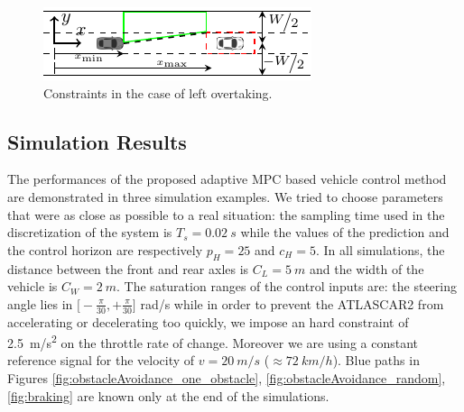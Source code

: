\documentclass[conference,11pt]{IEEEtran}
\begin{document}
\begin{figure}[H]
	\centering
	\includegraphics[width=0.9\columnwidth]{./figure/constraint/constraint.pdf}
%	
	\caption{Constraints in the case of left overtaking.}
	\label{fig:constraint}
\end{figure}
\subsection{Simulation Results}
The performances of the proposed adaptive MPC based vehicle control method are demonstrated in three
simulation examples. We tried to choose parameters that were as close as possible to a real situation: the sampling time used in the discretization of the system is $T_s=\SI{0.02}{s}$ while the values of the prediction and the control horizon are respectively $p_H=25$ and $c_H=5$. In all simulations, the distance between the front and rear axles is $C_L=\SI{5}{m}$ and the width of the vehicle is $C_W=\SI{2}{m}$. The saturation ranges of the control inputs are: the steering angle lies in $\big[-\frac{\pi}{30}, +\frac{\pi}{30}\big]$ rad/s while in order to prevent the ATLASCAR2 from accelerating or decelerating too quickly, we impose an hard constraint of \SI{2.5}{m/s^2} on the throttle rate of change. Moreover we are using a constant reference signal for the velocity of $v=\SI{20}{m/s}$ ($\approx\SI{72}{km/h}$).
Blue paths in Figures \ref{fig:obstacleAvoidance_one_obstacle}, \ref{fig:obstacleAvoidance_random}, \ref{fig:braking} are known only at the end of the simulations.
%
\end{document}
